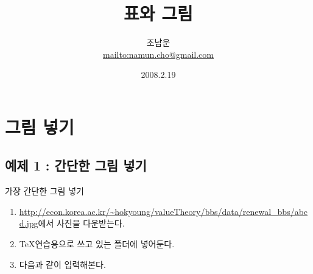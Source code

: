 \documentclass{beamer}
\begin{document}
\author{조남운\\\url{mailto:namun.cho@gmail.com}}
\title{표와 그림}
\date{2008.2.19}

\begin{frame}
\maketitle
\end{frame}



\section{그림 넣기}
\subsection{예제 1 : 간단한 그림 넣기}
\begin{frame}
\begin{block}{가장 간단한 그림 넣기 }
\begin{enumerate}[1{단계}.]
\item <1-> \url{http://econ.korea.ac.kr/~hokyoung/valueTheory/bbs/data/renewal_bbs/abcd.jpg}에서 사진을 다운받는다.
\item <2->\TeX 연습용으로 쓰고 있는 폴더에 넣어둔다. 
\item <3->다음과 같이 입력해본다. 
\end{enumerate}
\end{block}
\end{frame}
\end{document}

